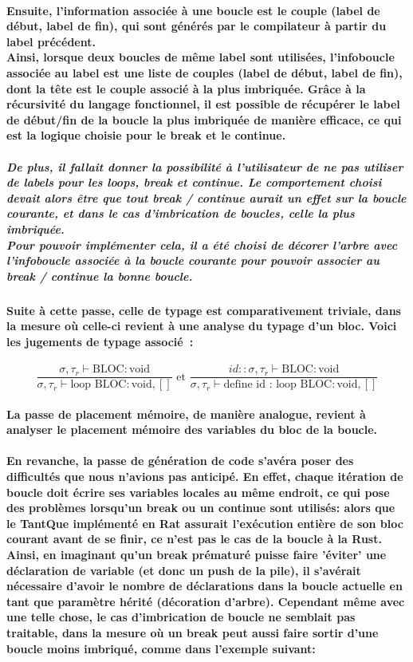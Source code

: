 \documentclass[french]{article}
\newcommand{\jugementLoop}{
        \dfrac{\sigma, \tau_r \vdash \text{BLOC} : \text{void}}
              {\sigma, \tau_r \vdash \text{loop} \text{ BLOC} : \text{void}, []}
        }
\newcommand{\jugementLoopId}{
        \dfrac{id::\sigma, \tau_r \vdash \text{BLOC} : \text{void}}
              {\sigma, \tau_r \vdash \text{define id : loop} \text{ BLOC} : \text{void}, []}
        }
\begin{document}
\paragraph{Ensuite, l'information associée à une boucle est le couple (label de début, label de fin), qui sont générés par le compilateur à partir du label précédent. \\
Ainsi, lorsque deux boucles de même label sont utilisées, l'infoboucle associée au label est une liste de couples 
(label de début, label de fin), dont la tête est le couple associé à la plus imbriquée.
Grâce à la récursivité du langage fonctionnel, il est possible de récupérer le label de début/fin de la boucle la plus imbriquée de manière efficace,
ce qui est la logique choisie pour le break et le continue.}
\subparagraph{De plus, il fallait donner la possibilité à l'utilisateur de ne pas utiliser de labels pour les loops, break et continue. Le comportement
choisi devait alors être que tout break / continue aurait un effet sur la boucle courante, et dans le cas d'imbrication de boucles, celle la 
plus imbriquée.\\
Pour pouvoir implémenter cela, il a été choisi de \textit{décorer l'arbre} avec l'infoboucle associée à la boucle courante pour pouvoir associer au break / continue
la bonne boucle.}
\paragraph{Suite à cette passe, celle de typage est comparativement triviale, dans la mesure où celle-ci revient à une analyse
du typage d'un bloc. Voici les jugements de typage associé~:}
 \[\jugementLoop \text{ et } \jugementLoopId\]
\paragraph{La passe de placement mémoire, de manière analogue, revient à analyser le placement mémoire des variables du bloc de la boucle.}
\paragraph{En revanche, la passe de génération de code s'avéra poser des difficultés que nous n'avions pas anticipé. En effet, chaque itération de boucle doit
écrire ses variables locales au même endroit, ce qui pose des problèmes lorsqu'un break ou un continue sont utilisés: alors que le TantQue
implémenté en Rat assurait l'exécution entière de son bloc courant avant de se finir, ce n'est pas le cas de la boucle à la Rust. \\
Ainsi, en imaginant qu'un break prématuré puisse faire 'éviter' une déclaration de variable (et donc un push de la pile), il s'avérait nécessaire
d'avoir le nombre de déclarations dans la boucle actuelle en tant que paramètre hérité (décoration d'arbre). Cependant même avec une telle chose, 
le cas d'imbrication de boucle ne semblait pas traitable, dans la mesure où un break peut aussi faire sortir d'une boucle moins imbriqué, comme dans 
l'exemple suivant:}
\end{document}
